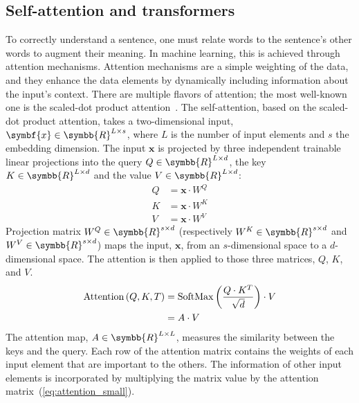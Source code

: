 \documentclass[../main.tex]{subfiles}
\begin{document}
	\subsection{Self-attention and transformers}\label{sec:self_attention_transformer}
		To correctly understand a sentence, one must relate words to the sentence's other words to augment their meaning.
		In machine learning, this is achieved through attention mechanisms.
		Attention mechanisms are a simple weighting of the data, and they enhance the data elements by dynamically including information about the input's context.
		There are multiple flavors of attention; the most well-known one is the scaled-dot product attention~\cite{AttentionAllYouNeed}.
		The self-attention, based on the scaled-dot product attention, takes a two-dimensional input, \(\symbf{x} \in \symbb{R}^{L\times s}\), where \(L\) is the number of input elements and \(s\) the embedding dimension.
		The input \(\symbf{x}\) is projected by three independent trainable linear projections into the query \(Q \in \symbb{R}^{L \times d}\), the key \(K \in \symbb{R}^{L \times d}\) and the value \(V \in \symbb{R}^{L \times d}\):
		\begin{align}
			Q & = \symbf{x}\cdot W^{Q} \\
			K & = \symbf{x}\cdot W^{K} \\
			V & = \symbf{x}\cdot W^{V}
		\end{align}
		Projection matrix \(W^Q \in \symbb{R}^{s \times d} \) (respectively \(W^K\in \symbb{R}^{s \times d}\) and \(W^V\in \symbb{R}^{s \times d}\)) maps the input, \(\symbf{x}\), from an \(s\)-dimensional space to a \(d\)-dimensional space.
		The attention is then applied to those three matrices, \(Q\), \(K\), and \(V\).
		\begin{align}
			\operatorname{Attention}\left(Q,K,T\right) & = \softmax\left( \frac{Q\cdot K^T}{\sqrt{d}}\right) \cdot V\label{eq:selfattention} \\
			                                           & = A \cdot V \label{eq:attention_small}
		\end{align}
		The attention map, \(A \in \symbb{R}^{L \times L}\), measures the similarity between the keys and the query.
		Each row of the attention matrix contains the weights of each input element that are important to the others.
		The information of other input elements is incorporated by multiplying the matrix value by the attention matrix~(\cref{eq:attention_small}).
\end{document}
